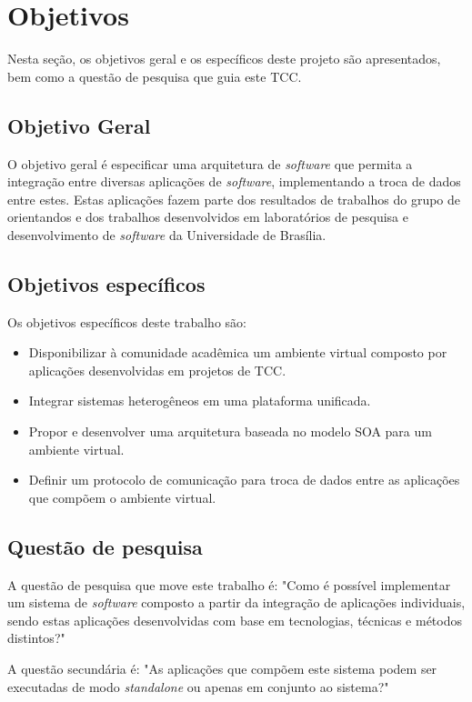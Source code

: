 \section{Objetivos}

Nesta seção, os objetivos geral e os específicos deste projeto são apresentados, bem como a questão de pesquisa que guia este TCC.

\subsection{Objetivo Geral}
O objetivo geral é especificar uma arquitetura de \textit{software} que permita a integração entre diversas aplicações de \textit{software}, implementando a troca de dados entre estes. Estas aplicações fazem parte dos resultados de trabalhos do grupo de orientandos e dos trabalhos desenvolvidos em laboratórios de pesquisa e desenvolvimento de \textit{software} da Universidade de Brasília.

\subsection{Objetivos específicos}
Os objetivos específicos deste trabalho são:
\begin{itemize}
\item Disponibilizar à comunidade acadêmica um ambiente virtual composto por aplicações desenvolvidas em projetos de TCC.
\item Integrar sistemas heterogêneos em uma plataforma unificada.
\item Propor e desenvolver uma arquitetura baseada no modelo SOA para um ambiente virtual.
\item Definir um protocolo de comunicação para troca de dados entre as aplicações que compõem o ambiente virtual.
\end{itemize}

\subsection{Questão de pesquisa}
A questão de pesquisa que move este trabalho é: "Como é possível implementar um sistema de \textit{software} composto a partir da integração de aplicações individuais, sendo estas aplicações desenvolvidas com base em tecnologias, técnicas e métodos distintos?"

A questão secundária é: "As aplicações que compõem este sistema podem ser executadas de modo \textit{standalone} ou apenas em conjunto ao sistema?"


